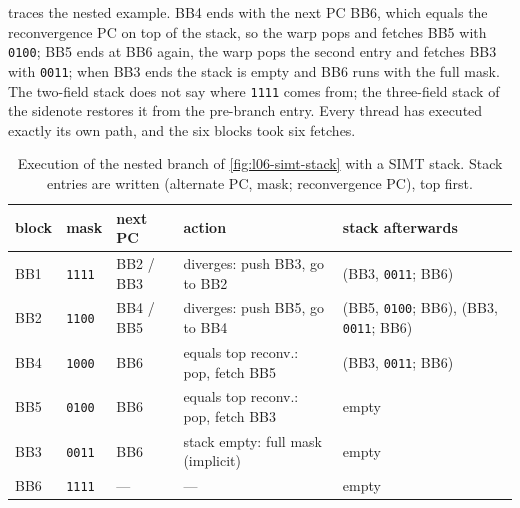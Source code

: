 \documentclass[../main.tex]{subfiles}
\begin{document}
 traces the nested example.  BB4 ends with the
next PC BB6, which equals the reconvergence PC on top of the stack, so
the warp pops and fetches BB5 with \texttt{0100}; BB5 ends at BB6 again,
the warp pops the second entry and fetches BB3 with \texttt{0011}; when
BB3 ends the stack is empty and BB6 runs with the full mask.  The
two-field stack does not say where \texttt{1111} comes from; the
three-field stack of the sidenote restores it from the pre-branch
entry.  Every
thread has executed exactly its own path, and the six blocks took six
fetches.

\begin{table}[tb]
  \centering
  \caption{Execution of the nested branch of \cref{fig:l06-simt-stack}
    with a SIMT stack.  Stack entries are written
    (alternate PC, mask; reconvergence PC), top first.}
  \label{tab:l06-simt-trace}
  \setlength{\tabcolsep}{4pt}
  \begin{tabular}{@{}l l l >{\raggedright\arraybackslash}p{30mm} >{\raggedright\arraybackslash}p{34mm}@{}}
    \toprule
    block & mask & next PC & action & stack afterwards \\
    \midrule
    BB1 & \texttt{1111} & BB2 / BB3 & diverges: push BB3, go to BB2
      & (BB3, \texttt{0011}; BB6) \\
    BB2 & \texttt{1100} & BB4 / BB5 & diverges: push BB5, go to BB4
      & (BB5, \texttt{0100}; BB6), (BB3, \texttt{0011}; BB6) \\
    BB4 & \texttt{1000} & BB6 & equals top reconv.: pop, fetch BB5
      & (BB3, \texttt{0011}; BB6) \\
    BB5 & \texttt{0100} & BB6 & equals top reconv.: pop, fetch BB3
      & empty \\
    BB3 & \texttt{0011} & BB6 & stack empty: full mask (implicit) & empty \\
    BB6 & \texttt{1111} & --- & --- & empty \\
    \bottomrule
  \end{tabular}
\end{table}
\end{document}
